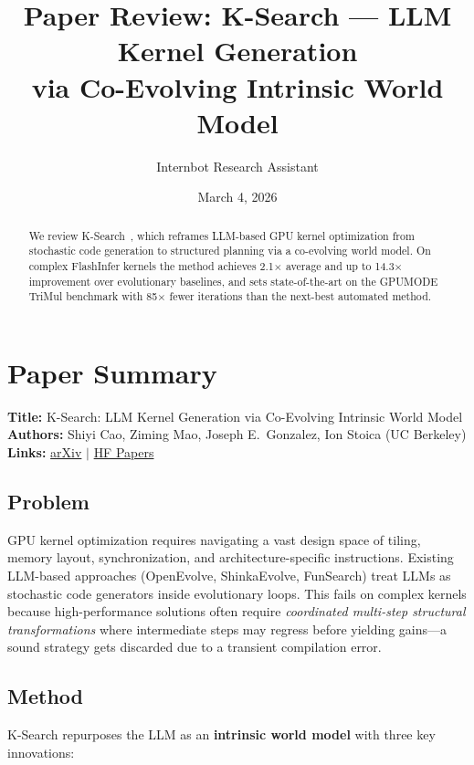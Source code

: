 \documentclass[11pt]{article}
\title{Paper Review: K-Search --- LLM Kernel Generation\\via Co-Evolving Intrinsic World Model}
\author{Internbot Research Assistant}
\date{March 4, 2026}
\begin{document}
\maketitle

\begin{abstract}
We review K-Search~\citep{cao2026ksearch}, which reframes LLM-based GPU kernel optimization from stochastic code generation to structured planning via a co-evolving world model. On complex FlashInfer kernels the method achieves 2.1$\times$ average and up to 14.3$\times$ improvement over evolutionary baselines, and sets state-of-the-art on the GPUMODE TriMul benchmark with 85$\times$ fewer iterations than the next-best automated method.
\end{abstract}

\section{Paper Summary}

\textbf{Title:} K-Search: LLM Kernel Generation via Co-Evolving Intrinsic World Model\\
\textbf{Authors:} Shiyi Cao, Ziming Mao, Joseph E.\ Gonzalez, Ion Stoica (UC Berkeley)\\
\textbf{Links:} \href{https://arxiv.org/abs/2602.19128}{arXiv} $\mid$ \href{https://huggingface.co/papers/2602.19128}{HF Papers}

\subsection{Problem}

GPU kernel optimization requires navigating a vast design space of tiling, memory layout, synchronization, and architecture-specific instructions. Existing LLM-based approaches (OpenEvolve, ShinkaEvolve, FunSearch) treat LLMs as stochastic code generators inside evolutionary loops. This fails on complex kernels because high-performance solutions often require \emph{coordinated multi-step structural transformations} where intermediate steps may regress before yielding gains---a sound strategy gets discarded due to a transient compilation error.

\subsection{Method}

K-Search repurposes the LLM as an \textbf{intrinsic world model} with three key innovations:
\end{document}
